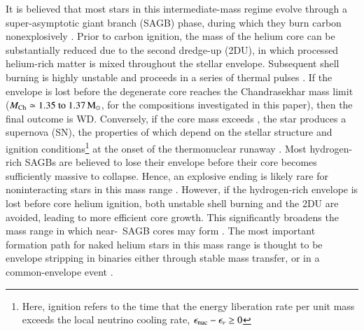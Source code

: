 \documentclass[main.tex]{subfiles}
\begin{document}
It is believed that most stars in this intermediate-mass regime evolve through a super-asymptotic giant branch (SAGB) phase, during which they burn carbon nonexplosively \citep[e.g.,][and references therein]{Ritossa:1999ApJ, siess2006, Poelarends:2007ip,doherty2015,Farmer:2015afs,Poelarends:2017dua}.
Prior to carbon ignition,  the mass of the helium core can be substantially reduced due to 
the  second dredge-up (2DU), in which processed helium-rich matter is mixed throughout the stellar envelope. Subsequent shell burning is highly unstable and proceeds in  a series  of thermal pulses \citep{Iben:1997abc,Vassiliadis:1993zz,Poelarends:2007ip}.
If the envelope is lost before the degenerate core reaches the Chandrasekhar mass limit ($\mch \simeq \numrange{1.35}{1.37}\msun$, for the compositions investigated in this paper), then the final outcome is WD. Conversely, if the core mass exceeds \mch, the star produces  a supernova (SN), the properties
of which depend on the stellar structure and ignition conditions\footnote{Here, ignition refers to the time that the energy liberation rate per unit mass exceeds the local neutrino cooling rate, $\epsilon_{\rm nuc} - \epsilon_{\rm \nu}\ge 0$} at the onset of the thermonuclear runaway \citep{rose1969,wheeler1978}.
Most hydrogen-rich SAGBs are believed to lose their envelope before their core becomes sufficiently massive to collapse. Hence, an explosive ending is likely rare for  noninteracting stars in this mass range \citep{Iben:1983ts,Poelarends:2007ip}. However, if the hydrogen-rich envelope is lost before core helium ignition, both unstable shell burning and the 2DU are avoided, leading to more efficient core growth. This significantly broadens the mass range in which  near-\mch\ SAGB cores may form \citep[e.g.,][and references therein]{Podsiadlowski:2003py,Poelarends:2007ip,Woosley:2019sdf}.   
The most important formation path for naked helium  stars in this mass range is thought to be envelope stripping in binaries either through stable mass transfer, or in a common-envelope event \citep{Tauris:2015xra,Tauris2017ApJ,Siess2018leb,Laplace2020aa}. 
\end{document}
